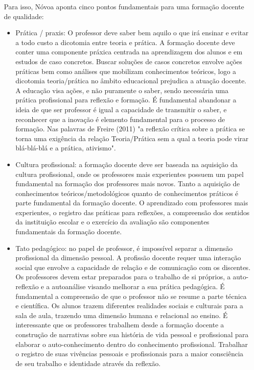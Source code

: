     
	Para isso, Nóvoa aponta cinco pontos fundamentais para uma formação docente de qualidade:
    \begin{itemize}  
	\item Prática / praxis: O professor deve saber bem aquilo o que irá ensinar e evitar a todo custo a dicotomia entre teoria e prática. A formação docente deve conter uma componente práxica centrada na aprendizagem dos alunos e em estudos de caso concretos. Buscar soluções de casos concretos envolve ações práticas bem como análises que mobilizam conhecimentos teóricos, logo a dicotomia teoria/prática no âmbito educacional prejudica a atuação docente. A educação visa ações, e não puramente o saber, sendo necessária uma prática profissional para reflexão e formação. É fundamental abandonar a ideia de que ser professor é igual a capacidade de transmitir o saber, e reconhecer que a inovação é elemento fundamental para o processo de formação. Nas palavras de Freire (2011) "a reflexão crítica sobre a prática se torna uma exigência da relação Teoria/Prática sem a qual a teoria pode virar blá-blá-blá e a prática, ativismo". 
    
    
	\item Cultura profissional: a formação docente deve ser baseada na aquisição da cultura profissional, onde os professores mais experientes possuem um papel fundamental na formação dos professores mais novos. Tanto a aquisição de conhecimentos teóricos/metodológicos quanto de conhecimentos práticos é parte fundamental da formação docente. O aprendizado com professores mais experientes, o registro das práticas para reflexões, a compreensão dos sentidos da instituição escolar e o exercício da avaliação são componentes fundamentais da formação docente.
    
    
	\item Tato pedagógico: no papel de professor, é impossível separar a dimensão profissional da dimensão pessoal. A profissão docente requer uma interação social que envolve a capacidade de relação e de comunicação com os discentes. Os professores devem estar preparados para o trabalho de si próprios, a auto-reflexão e a autoanálise visando melhorar a sua prática pedagógica. É fundamental a compreensão de que o professor não se resume a parte técnica e científica. Os alunos trazem diferentes realidades sociais e culturais para a sala de aula, trazendo uma dimensão humana e relacional ao ensino. É interessante que os professores trabalhem desde a formação docente a construção de narrativas sobre sua história de vida pessoal e profissional para elaborar o auto-conhecimento dentro do conhecimento profissional. Trabalhar o registro de suas vivências pessoais e profissionais para a maior consciência de seu trabalho e identidade através da reflexão.
    

\end{itemize}

